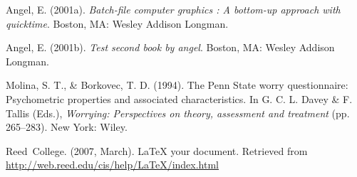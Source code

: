 \documentclass[12pt,twoside]{amherstthesis}
\begin{document}
  \hypertarget{ref-angel2001}{}
  Angel, E. (2001a). \emph{Batch-file computer graphics : A bottom-up
  approach with quicktime}. Boston, MA: Wesley Addison Longman.
  
  \hypertarget{ref-angel2002a}{}
  Angel, E. (2001b). \emph{Test second book by angel}. Boston, MA: Wesley
  Addison Longman.
  
  \hypertarget{ref-Molina1994}{}
  Molina, S. T., \& Borkovec, T. D. (1994). The Penn State worry
  questionnaire: Psychometric properties and associated characteristics.
  In G. C. L. Davey \& F. Tallis (Eds.), \emph{Worrying: Perspectives on
  theory, assessment and treatment} (pp. 265--283). New York: Wiley.
  
  \hypertarget{ref-reedweb2007}{}
  Reed~College. (2007, March). LaTeX your document. Retrieved from
  \url{http://web.reed.edu/cis/help/LaTeX/index.html}


\end{document}
